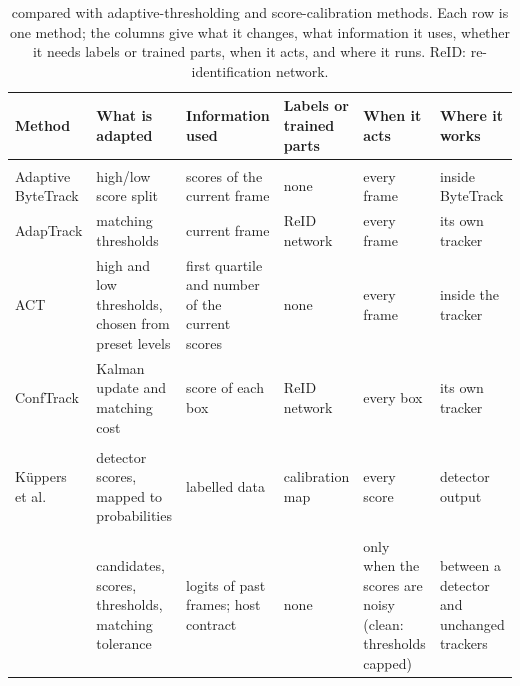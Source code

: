 \begin{table}[!tp]
\caption{\scl{} compared with adaptive-thresholding and score-calibration methods. Each row is one method; the columns give what it changes, what information it uses, whether it needs labels or trained parts, when it acts, and where it runs. ReID: re-identification network.}
\label{tab:compare}
\centering\footnotesize
\setlength{\tabcolsep}{3pt}
\begin{tabular}{@{}>{\raggedright\arraybackslash}p{23mm}>{\raggedright\arraybackslash}p{28mm}>{\raggedright\arraybackslash}p{28mm}>{\raggedright\arraybackslash}p{19mm}>{\raggedright\arraybackslash}p{24mm}>{\raggedright\arraybackslash}p{25mm}@{}}
\toprule
Method & What is adapted & Information used & Labels or trained parts & When it acts & Where it works\\
\midrule
\multicolumn{6}{@{}l}{\textit{Adaptive thresholding}}\\
Adaptive ByteTrack \cite{ma2023adaptivebytetrack} & high/low score split & scores of the current frame & none & every frame & inside ByteTrack\\
AdapTrack \cite{shim2024adaptrack} & matching thresholds & current frame & ReID network & every frame & its own tracker\\
ACT \cite{act2026adaptive} & high and low thresholds, chosen from preset levels & first quartile and number of the current scores & none & every frame & inside the tracker\\
ConfTrack \cite{jung2024conftrack} & Kalman update and matching cost & score of each box & ReID network & every box & its own tracker\\
\addlinespace[3pt]
\multicolumn{6}{@{}l}{\textit{Score calibration}}\\
K{\"u}ppers et al.\ \cite{kuppers2020detcalib} & detector scores, mapped to probabilities & labelled data & calibration map & every score & detector output\\
\addlinespace[3pt]
\multicolumn{6}{@{}l}{\textit{This paper}}\\
\scl{} & candidates, scores, thresholds, matching tolerance & logits of past frames; host contract & none & only when the scores are noisy (clean: thresholds capped) & between a detector and unchanged trackers\\
\bottomrule
\end{tabular}
\end{table}
